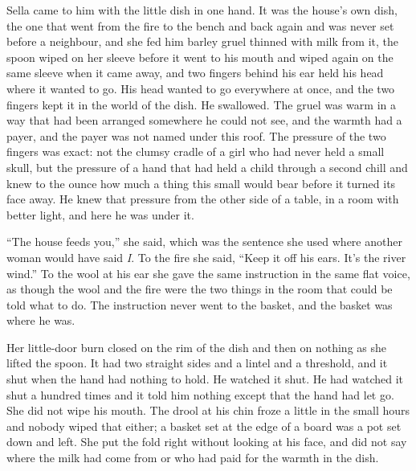 \scenebreak

Sella came to him with the little dish in one hand. It was the house's own dish, the one that went from the fire to the bench and back again and was never set before a neighbour, and she fed him barley gruel thinned with milk from it, the spoon wiped on her sleeve before it went to his mouth and wiped again on the same sleeve when it came away, and two fingers behind his ear held his head where it wanted to go. His head wanted to go everywhere at once, and the two fingers kept it in the world of the dish. He swallowed. The gruel was warm in a way that had been arranged somewhere he could not see, and the warmth had a payer, and the payer was not named under this roof. The pressure of the two fingers was exact: not the clumsy cradle of a girl who had never held a small skull, but the pressure of a hand that had held a child through a second chill and knew to the ounce how much a thing this small would bear before it turned its face away. He knew that pressure from the other side of a table, in a room with better light, and here he was under it.

“The house feeds you,” she said, which was the sentence she used where another woman would have said \emph{I}. To the fire she said, “Keep it off his ears. It's the river wind.” To the wool at his ear she gave the same instruction in the same flat voice, as though the wool and the fire were the two things in the room that could be told what to do. The instruction never went to the basket, and the basket was where he was.

Her little-door burn closed on the rim of the dish and then on nothing as she lifted the spoon. It had two straight sides and a lintel and a threshold, and it shut when the hand had nothing to hold. He watched it shut. He had watched it shut a hundred times and it told him nothing except that the hand had let go. She did not wipe his mouth. The drool at his chin froze a little in the small hours and nobody wiped that either; a basket set at the edge of a board was a pot set down and left. She put the fold right without looking at his face, and did not say where the milk had come from or who had paid for the warmth in the dish.

\scenebreak

